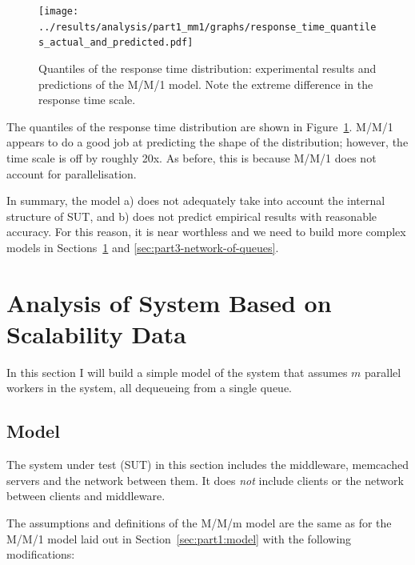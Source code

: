 \documentclass[11pt]{article}
\begin{document}
\begin{figure}[h]
\texttt{[image: ../results/analysis/part1\_mm1/graphs/response\_time\_quantiles\_actual\_and\_predicted.pdf]}
\caption{Quantiles of the response time distribution: experimental results and predictions of the M/M/1 model. Note the extreme difference in the response time scale.}
\label{fig:part1:quantiles_responsetime}
\end{figure}


The quantiles of the response time distribution are shown in Figure~\ref{fig:part1:quantiles_responsetime}. M/M/1 appears to do a good job at predicting the shape of the distribution; however, the time scale is off by roughly 20x. As before, this is because M/M/1 does not account for parallelisation.

In summary, the model a) does not adequately take into account the internal structure of SUT, and b) does not predict empirical results with reasonable accuracy. For this reason, it is near worthless and we need to build more complex models in Sections~\ref{sec:part2-analysis-scalability} and \ref{sec:part3-network-of-queues}.

\clearpage
\section{Analysis of System Based on Scalability Data}\label{sec:part2-analysis-scalability}

In this section I will build a simple model of the system that assumes $m$ parallel workers in the system, all dequeueing from a single queue.

\subsection{Model}

The system under test (SUT) in this section includes the middleware, memcached servers and the network between them. It does \emph{not} include clients or the network between clients and middleware.

The assumptions and definitions of the M/M/m model are the same as for the M/M/1 model laid out in Section~\ref{sec:part1:model} with the following modifications:
\end{document}

